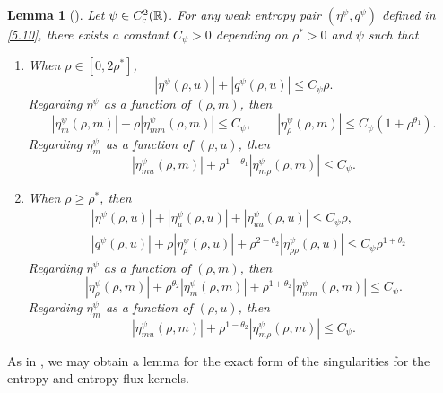 \documentclass[reqno,11pt]{amsart}
\numberwithin{equation}{section}
\newtheorem{lemma}[theorem]{Lemma}
\theoremstyle{definition}
\begin{document}
\begin{lemma}[]\label{entropyan}
 Let $\psi \in C^2_{\rm c}(\mathbb{R})$. 
 For any weak entropy pair $(\eta^\psi,q^\psi)$ defined in \eqref{5.10}, 
there exists a constant $C_\psi > 0$ depending on $\rho^* > 0$ and $\psi$ 
 such that
 \begin{enumerate}
 \item[\rm (i)] When $\rho \in [0,2\rho^*]$,
  \[
 |\eta^\psi(\rho,u)| + |q^\psi(\rho,u)| \leq C_\psi \rho.
 \]
 Regarding $\eta^\psi$ as a function of $(\rho,m)$, then
 \[
 |\eta^\psi_m(\rho,m)| + \rho |\eta_{mm}^\psi(\rho,m)| \leq C_\psi, \qquad |\eta^\psi_\rho(\rho,m)| \leq C_\psi(1+\rho^{\theta_1}).
  \]
Regarding $\eta_m^\psi$ as a function of $(\rho,u)$, then
 \[
   |\eta^\psi_{mu}(\rho,m)| + \rho^{1-\theta_1}| \eta_{m\rho}^\psi(\rho,m)| \leq C_\psi.
 \]
 \item[\rm (ii)] When $\rho \geq \rho^*$, then
 \begin{align*}
     &|\eta^\psi(\rho,u)| + |\eta_u^\psi(\rho,u)| + |\eta_{uu}^\psi(\rho,u)| \leq C_\psi \rho,\\
     &|q^\psi(\rho,u)| + \rho|\eta_\rho^\psi(\rho,u)| + \rho^{2-\theta_2}|\eta_{\rho \rho}^\psi(\rho,u)| 
     \leq C_\psi \rho^{1 + \theta_2}
 \end{align*}
  Regarding $\eta^\psi$ as a function of $(\rho,m)$, then
 \[
 |\eta^\psi_\rho(\rho,m)| + \rho^{\theta_2}| \eta_{m}^\psi(\rho,m)| + \rho^{1 + \theta_2}| \eta_{mm}^\psi(\rho,m)| \leq C_\psi.
 \]
 Regarding $\eta_m^\psi$ as a function of $(\rho,u)$, then
\[
  |\eta^\psi_{mu}(\rho,m)| + \rho^{1-\theta_2}| \eta_{m\rho}^\psi(\rho,m)| \leq C_\psi.
   \]
  \end{enumerate}
    \end{lemma}

    As in \cite{Schrecker_2019}, we may obtain a lemma for the exact form of the singularities for the entropy and entropy flux kernels.
\end{document}
